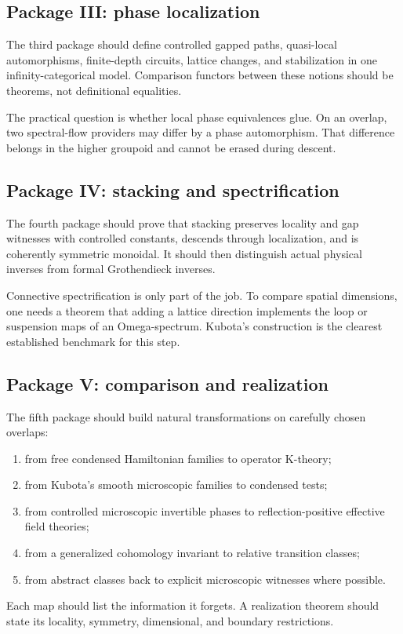 \documentclass[12pt]{article}
\theoremstyle{definition}
\theoremstyle{remark}
\begin{document}
\subsection{Package III: phase localization}

The third package should define controlled gapped paths, quasi-local
automorphisms, finite-depth circuits, lattice changes, and stabilization in
one infinity-categorical model.  Comparison functors between these notions
should be theorems, not definitional equalities.

The practical question is whether local phase equivalences glue.  On an
overlap, two spectral-flow providers may differ by a phase automorphism.
That difference belongs in the higher groupoid and cannot be erased during
descent.

\subsection{Package IV: stacking and spectrification}

The fourth package should prove that stacking preserves locality and gap
witnesses with controlled constants, descends through localization, and is
coherently symmetric monoidal.  It should then distinguish actual physical
inverses from formal Grothendieck inverses.

Connective spectrification is only part of the job.  To compare spatial
dimensions, one needs a theorem that adding a lattice direction implements
the loop or suspension maps of an Omega-spectrum.  Kubota's construction is
the clearest established benchmark for this step.

\subsection{Package V: comparison and realization}

The fifth package should build natural transformations on carefully chosen
overlaps:
\begin{enumerate}[leftmargin=2.2em]
  \item from free condensed Hamiltonian families to operator K-theory;
  \item from Kubota's smooth microscopic families to condensed tests;
  \item from controlled microscopic invertible phases to reflection-positive
  effective field theories;
  \item from a generalized cohomology invariant to relative transition
  classes;
  \item from abstract classes back to explicit microscopic witnesses where
  possible.
\end{enumerate}
Each map should list the information it forgets.  A realization theorem
should state its locality, symmetry, dimensional, and boundary restrictions.
\end{document}
